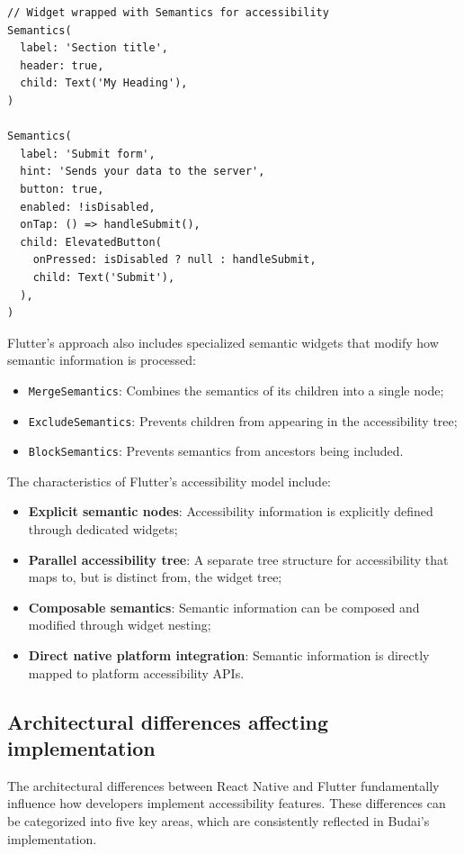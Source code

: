 \begin{lstlisting}[style=DartStyle, caption=Flutter Semantics widget system, label=lst:flutter-semantics]
// Widget wrapped with Semantics for accessibility
Semantics(
  label: 'Section title',
  header: true,
  child: Text('My Heading'),
)

Semantics(
  label: 'Submit form',
  hint: 'Sends your data to the server',
  button: true,
  enabled: !isDisabled,
  onTap: () => handleSubmit(),
  child: ElevatedButton(
    onPressed: isDisabled ? null : handleSubmit,
    child: Text('Submit'),
  ),
)
\end{lstlisting}

Flutter's approach also includes specialized semantic widgets that modify how semantic information is processed:

\begin{itemize}
    \item \texttt{MergeSemantics}: Combines the semantics of its children into a single node;
    \item \texttt{ExcludeSemantics}: Prevents children from appearing in the accessibility tree;
    \item \texttt{BlockSemantics}: Prevents semantics from ancestors being included.
\end{itemize}

The characteristics of Flutter's accessibility model include:

\begin{itemize}
    \item \textbf{Explicit semantic nodes}: Accessibility information is explicitly defined through dedicated widgets;
    \item \textbf{Parallel accessibility tree}: A separate tree structure for accessibility that maps to, but is distinct from, the widget tree;
    \item \textbf{Composable semantics}: Semantic information can be composed and modified through widget nesting;
    \item \textbf{Direct native platform integration}: Semantic information is directly mapped to platform accessibility APIs.
\end{itemize}

\subsection{Architectural differences affecting implementation}
\label{subsec:arch-differences}

The architectural differences between React Native and Flutter fundamentally influence how developers implement accessibility features. These differences can be categorized into five key areas, which are consistently reflected in Budai's implementation.

